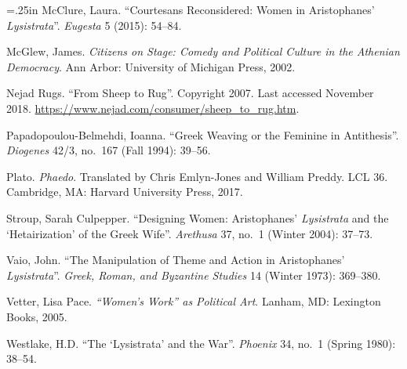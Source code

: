 \documentclass[12pt]{article}
\makeatletter
\newcommand{\hangpara}[2]{\hangindent#1\hangafter#2\noindent}
\newenvironment{hangparas}[2]{\setlength{\parindent}{\z@}%
  \everypar={\hangpara{#1}{#2}}}{\par}
\makeatother
\begin{document}
\begin{singlespacing}
\begin{hangparas}{.25in}{1}
McClure, Laura. ``Courtesans Reconsidered: Women in Aristophanes' \textit{Lysistrata}''. \textit{Eugesta} 5 (2015): 54--84.

McGlew, James. \textit{Citizens on Stage: Comedy and Political Culture in the Athenian Democracy}. Ann Arbor: University of Michigan Press, 2002.

Nejad Rugs. ``From Sheep to Rug''. Copyright 2007. Last accessed November 2018. \url{https://www.nejad.com/consumer/sheep_to_rug.htm}.

Papadopoulou-Belmehdi, Ioanna. ``Greek Weaving or the Feminine in Antithesis''. \textit{Diogenes} 42/3, no.~167 (Fall 1994): 39--56.

Plato. \textit{Phaedo}. Translated by Chris Emlyn-Jones and William Preddy. LCL 36. Cambridge, MA: Harvard University Press, 2017.

Stroup, Sarah Culpepper. ``Designing Women: Aristophanes' \textit{Lysistrata} and the `Hetairization' of the Greek Wife''. \textit{Arethusa} 37, no.~1 (Winter 2004): 37--73.

Vaio, John. ``The Manipulation of Theme and Action in Aristophanes' \textit{Lysistrata}''. \textit{Greek, Roman, and Byzantine Studies} 14 (Winter 1973): 369--380.

Vetter, Lisa Pace. \textit{``Women's Work'' as Political Art}. Lanham, MD: Lexington Books, 2005.

Westlake, H.D. ``The `Lysistrata' and the War''. \textit{Phoenix} 34, no.~1 (Spring 1980): 38--54.
\end{hangparas}
\end{singlespacing}
\end{document}
